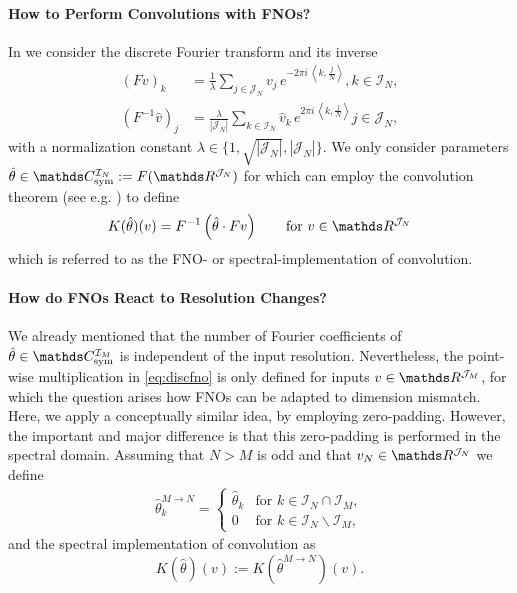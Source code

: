 \paragraph{How to Perform Convolutions with FNOs?}
%
%
In \cite{kabri2023resolution} we consider the discrete Fourier transform and its inverse
%
\begin{align*}
\left(Fv\right)_k &= \frac{1}{\lambda} \sum_{j \in \mathcal{J}_N} v_j\, e^{-2\pi i \, \left\langle k, \frac{j}{N}\right\rangle},  k \in \mathcal{I}_N,\\
%
\left(F^{-1}\hat{v}\right)_j &= \frac{\lambda}{|\mathcal{J}_N|}\sum_{k \in \mathcal{I}_N} \hat{v}_k\, e^{2\pi i \, \left\langle k, \frac{j}{N}\right\rangle} j \in \mathcal{J}_N,
\end{align*}
%
with a normalization constant $\lambda \in \{1, \sqrt{|\mathcal{J}_N|}, |\mathcal{J}_N|\}$. We only consider parameters $\hat\param\in \Csym^{\mathcal{I}_N} := F(\R^{\mathcal{J}_N})$ for which can employ the convolution theorem (see e.g. \cite{grafakos}) to define
%
\begin{align}\label{eq:discfno}
K(\hat{\theta})(v) = F^{-1}\left(\hat{\theta} \cdot Fv\right) \qquad \text{for }v \in \R^{\mathcal{J}_N}
\end{align}
%
which is referred to as the FNO- or spectral-implementation of convolution.
%
%
\paragraph{How do FNOs React to Resolution Changes?}
%
We already mentioned that the number of Fourier coefficients of $\hat\param\in\Csym^{\mathcal{I}_M}$ is independent of the input resolution. Nevertheless, the point-wise multiplication in \cref{eq:discfno} is only defined for inputs $\imgg\in\R^{\mathcal{J}_M}$, for which the question arises how FNOs can be adapted to dimension mismatch. Here, we apply a conceptually similar idea, by employing zero-padding. However, the important and major difference is that this zero-padding is performed in the spectral domain. Assuming that $N>M$ is odd and that $\imgg_N\in\R^{\mathcal{J}_N}$ we define
%
%
\begin{align*}
\hat{\theta}^{M \rightarrow N}_k = \begin{cases}
\hat{\theta}_k & \text{for } k \in \mathcal{I}_N \cap \mathcal{I}_M,\\
0 & \text{for } k \in \mathcal{I}_N \backslash \mathcal{I}_M,
\end{cases}
\end{align*}
%
%
and the spectral implementation of convolution as
%
%
\begin{equation*}
   K(\hat{\theta})(v) := K(\hat{\theta}^{M \rightarrow N})(v).
\end{equation*}
%
%
